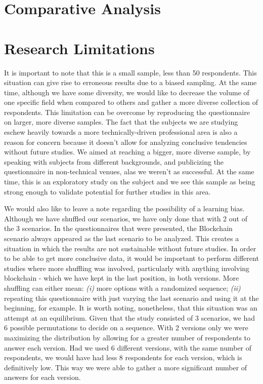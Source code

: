 \section{Comparative Analysis}

\section{Research Limitations}

It is important to note that this is a small sample, less than 50 respondents. This situation can give rise to erroneous results due to a biased sampling. At the same time, although we have some diversity, we would like to decrease the volume of one specific field when compared to others and gather a more diverse collection of respondents. This limitation can be overcome by reproducing the questionnaire on larger, more diverse samples. The fact that the subjects we are studying eschew heavily towards a more technically-driven professional area is also a reason for concern because it doesn't allow for analyzing conclusive tendencies without future studies. We aimed at reaching a bigger, more diverse sample, by speaking with subjects from different backgrounds, and publicizing the questionnaire in non-technical venues, alas we weren't as successful. At the same time, this is an exploratory study on the subject and we see this sample as being strong enough to validate potential for further studies in this area.

We would also like to leave a note regarding the possibility of a learning bias. Although we have shuffled our scenarios, we have only done that with 2 out of the 3 scenarios. In the questionnaires that were presented, the Blockchain scenario always appeared as the last scenario to be analyzed. This creates a situation in which the results are not sustainable without future studies. In order to be able to get more conclusive data, it would be important to perform different studies where more shuffling was involved, particularly with anything involving blockchain - which we have kept in the last position, in both versions. More shuffling can either mean: \textit{(i)} more options with a randomized sequence; \textit{(ii)} repeating this questionnaire with just varying the last scenario and using it at the beginning, for example. It is worth noting, nonetheless, that this situation was an attempt at an equilibrium. Given that the study consisted of 3 scenarios, we had 6 possible permutations to decide on a sequence. With 2 versions only we were maximizing the distribution by allowing for a greater number of respondents to answer each version. Had we used 6 different versions, with the same number of respondents, we would have had less 8 respondents for each version, which is definitively low. This way we were able to gather a more significant number of answers for each version.

